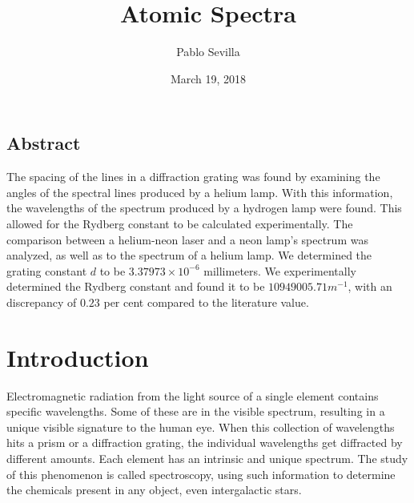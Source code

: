 \documentclass[a4paper]{article}
\title{Atomic Spectra}
\date{March 19, 2018}
\author{Pablo Sevilla}
\begin{document}
  \maketitle
  
\begin{center}
  \section*{Abstract}
  \centering
  The spacing of the lines in a diffraction grating was found by examining the angles of the spectral lines produced by a helium lamp. With this information, the wavelengths of the spectrum produced by a hydrogen lamp were found. This allowed for the Rydberg constant to be calculated experimentally. The comparison between a helium-neon laser and a neon lamp's spectrum was analyzed, as well as to the spectrum of a helium lamp. We determined the grating constant $d$ to be $3.37973\times 10^{-6}$ millimeters. We experimentally determined the Rydberg constant and found it to be $10949005.71m^{-1}$, with an discrepancy of $0.23$ per cent compared to the literature value.
\end{center}
\newpage

\section{Introduction}
Electromagnetic radiation from the light source of a single element contains specific wavelengths. Some of these are in the visible spectrum, resulting in a unique visible signature to the human eye. When this collection of wavelengths hits a prism or a diffraction grating, the individual wavelengths get diffracted by different amounts. Each element has an intrinsic and unique spectrum. The study of this phenomenon is called spectroscopy, using such information to determine the chemicals present in any object, even intergalactic stars.
\end{document}
